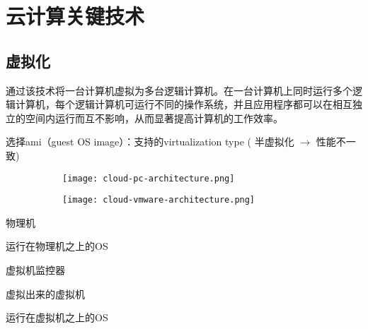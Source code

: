 \chapter{云计算关键技术}

\section{虚拟化}

\begin{definition}[虚拟化]
    通过该技术将一台计算机虚拟为多台逻辑计算机。在一台计算机上同时运行多个逻辑计算机，每个逻辑计算机可运行不同的操作系统，并且应用程序都可以在相互独立的空间内运行而互不影响，从而显著提高计算机的工作效率。
\end{definition}

\begin{example}[Amazon开启虚拟机]
    选择ami（guest OS image）：支持的virtualization type ( 半虚拟化 $\rightarrow$ 性能不一致)
\end{example}

\begin{figure}
    \centering
    \begin{subfigure}[b]{0.3 \textwidth}
        \centering
        \texttt{[image: cloud-pc-architecture.png]}
    \end{subfigure}
    \begin{subfigure}[b]{0.3 \textwidth}
        \centering
        \texttt{[image: cloud-vmware-architecture.png]}
    \end{subfigure}
\end{figure}

\begin{definition}
    物理机
\end{definition}

\begin{definition}[Host OS]
    运行在物理机之上的OS
\end{definition}

\begin{definition}
    虚拟机监控器
\end{definition}

\begin{definition}
    虚拟出来的虚拟机
\end{definition}

\begin{definition}[Guest OS]
    运行在虚拟机之上的OS
\end{definition}


